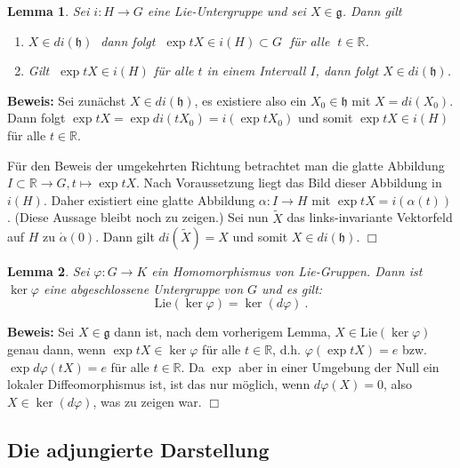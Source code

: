 \documentclass[12pt,a4paper]{article}
\def\R{\mathbb{R}}
\def\Lie{\mathrm{Lie}}
\def\g{\mathfrak{g}}
\def\h{\mathfrak{h}}
\newtheorem{Lemma}{Lemma}[section]
\def\proof{\noindent\textbf{Beweis:}\quad}
\def\qed{\quad\hfill\ensuremath{\Box}}
\begin{document}
\bigskip

\begin{Lemma}
Sei $i: H \rightarrow G$ eine Lie-Untergruppe und sei $X\in \g$. Dann gilt
\begin{enumerate}
\item
$ X \in di(\h)\;$ dann folgt $\;\exp tX \in i(H)\subset G\;$ f\"ur alle $\;t\in
\R$.
\item
Gilt $\;\exp tX \in i(H)$ f\"ur alle $t$ in einem Intervall $I$, dann folgt $X \in di(\h)$.
\end{enumerate}
\end{Lemma}
\proof
Sei zun\"achst $X\in di(\h)$, es existiere also ein $X_0\in \h$ mit $X =di(X_0)$. Dann folgt
$\exp tX = \exp di(tX_0) = i (\exp tX_0)$ und somit $\exp tX \in i(H)$ f\"ur alle $t\in \R$.

\medskip

F\"ur den Beweis der umgekehrten Richtung betrachtet man die glatte Abbildung $I \subset \R \rightarrow G,
t\mapsto \exp tX$. Nach Voraussetzung liegt das Bild dieser Abbildung in $i(H)$. Daher existiert
eine glatte Abbildung $\alpha : I \rightarrow H$ mit $\exp tX = i(\alpha(t))$.
(Diese Aussage bleibt noch zu zeigen.) Sei nun $\tilde X$ das links-invariante
Vektorfeld auf $H$ zu $\dot \alpha (0)$. Dann gilt $di (\tilde X) = X$ und somit
$X \in di (\h)$.
\qed

\bigskip

\begin{Lemma}\label{kern}
Sei $\varphi : G \rightarrow K$ ein Homomorphismus von Lie-Gruppen. Dann ist $\ker \varphi$ eine
abgeschlossene Untergruppe von $G$ und es gilt:
$$
\Lie(\ker \varphi) = \ker (d\varphi) \ .
$$
\end{Lemma}
\proof
Sei $X\in \g$ dann ist, nach dem vorherigem Lemma, $X\in \Lie(\ker \varphi) $ genau dann, wenn
$\exp tX \in \ker \varphi$ f\"ur alle $t\in \R$, d.h. $\varphi (\exp tX) = e$ bzw.
$\exp d\varphi (tX)=e$ f\"ur alle $t\in \R$. Da $\exp$ aber in einer Umgebung der Null
ein lokaler Diffeomorphismus ist, ist das nur m\"oglich, wenn $d\varphi (X)=0$, also
$X\in \ker (d\varphi)$, was zu zeigen war.
\qed

\bigskip













\subsection{Die adjungierte Darstellung}
\end{document}
